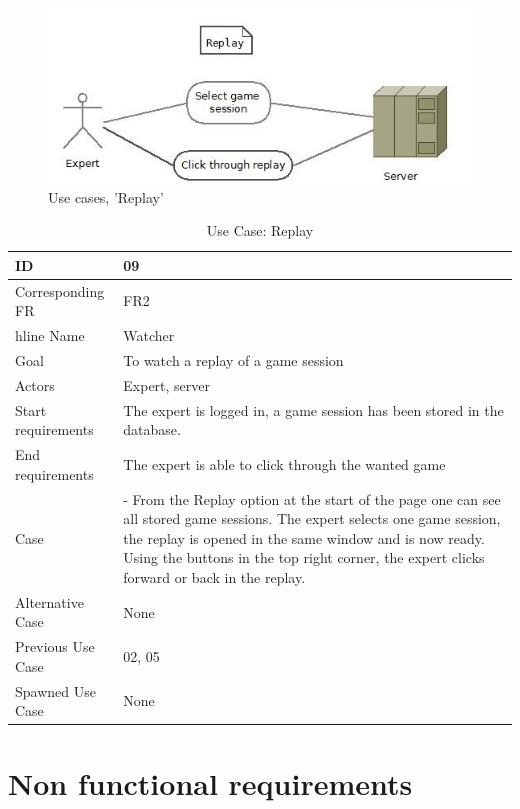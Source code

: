 \begin{figure}[H]
  \centering
    \includegraphics[width=1.0\textwidth]{img/replay.jpg}
  \caption{Use cases, 'Replay'} 
  \label{fig:replay}
\end{figure}


\begin{table}[H]
\begin{tabular}{|l|p{14cm}|}
\hline
	\textbf{ID} & \textbf{09}\\ \hline
	Corresponding FR & FR2\\hline
	Name & Watcher\\ \hline
	Goal & To watch a replay of a game session\\ \hline
	Actors & Expert, server\\ \hline
	Start requirements & The expert is logged in, a game session has been stored in the database. \\ \hline
	End requirements & The expert is able to click through the wanted game\\ \hline
	Case & - From the Replay option at the start of the page one can see all stored game sessions. The expert selects one game session, the replay is opened in the same window and is now ready. Using the buttons in the top right corner, the expert clicks forward or back in the replay.\\
	Alternative Case & None \\ \hline
	Previous Use Case & 02, 05\\ \hline
	Spawned Use Case & None\\ \hline
\end{tabular}
\caption{Use Case: Replay}
\label{fig:usecase09table}
\end{table}






\section{Non functional requirements} 



